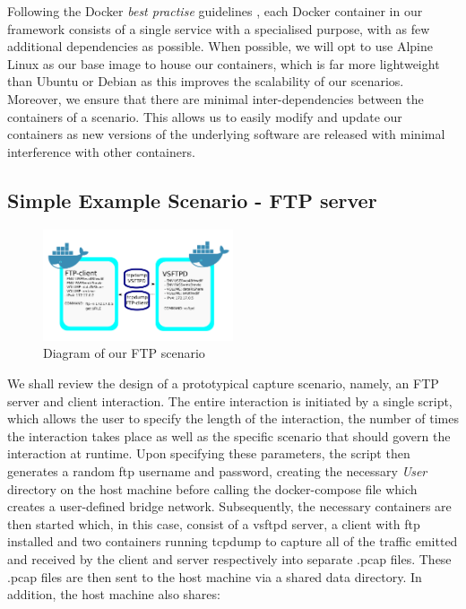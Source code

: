 \documentclass[sigconf,anonymous]{acmart}\usepackage[]{graphicx}\usepackage[]{color}
\begin{document}
Following the Docker \textit{best practise} guidelines \cite{bestpractise}, each Docker container in our framework consists of a single service with a specialised purpose, with as few additional dependencies as possible. When possible, we will opt to use Alpine Linux as our base image to house our containers, which is far more lightweight than Ubuntu or Debian as this improves the scalability of our scenarios. Moreover, we ensure that there are minimal inter-dependencies between the containers of a scenario. This allows us to easily modify and update our containers as new versions of the underlying software are released with minimal interference with other containers.

  
\subsection{Simple Example Scenario - FTP server}
\begin{figure}[h!]
\centering
\includegraphics[width=0.50\textwidth]{images/ftp_example.png}
\caption{Diagram of our FTP scenario}
\end{figure}

We shall review the design of a prototypical capture scenario, namely, an FTP server and client interaction. The entire interaction is initiated by a single script, which allows the user to specify the length of the interaction, the number of times the interaction takes place as well as the specific scenario that should govern the interaction at runtime. Upon specifying these parameters, the script then generates a random ftp username and password, creating the necessary \textit{User} directory on the host machine before calling the docker-compose file which creates a user-defined bridge network. Subsequently, the necessary containers are then started which, in this case, consist of a vsftpd server, a client with ftp installed and two containers running tcpdump to capture all of the traffic emitted and received by the client and server respectively into separate .pcap files. These .pcap files are then sent to the host machine via a shared data directory. In addition, the host machine also shares:
    
\end{document}
